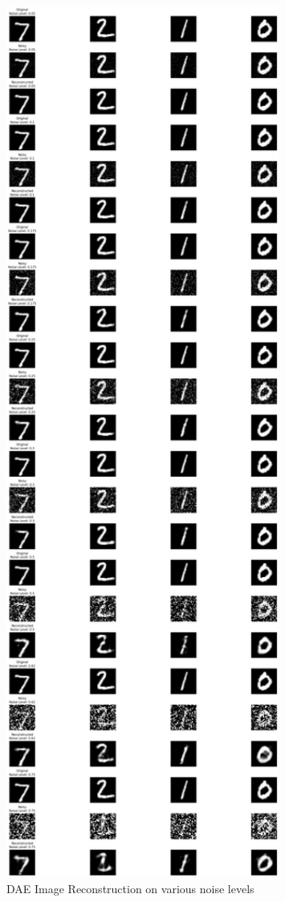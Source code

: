 \begin{figure}[htbp]
  \centering
  \includegraphics[width=0.8\textwidth]{figures/reconstructed_images.png}
  \caption{DAE Image Reconstruction on various noise levels}
  \label{fig:dae_imgreconst}
\end{figure}

